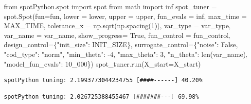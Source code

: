 \documentclass[
  letterpaper,
  DIV=11,
  numbers=noendperiod]{scrreprt}
\newenvironment{Shaded}{\begin{snugshade}}{\end{snugshade}}
\newcommand{\BuiltInTok}[1]{\textcolor[rgb]{0.00,0.23,0.31}{#1}}
\newcommand{\DecValTok}[1]{\textcolor[rgb]{0.68,0.00,0.00}{#1}}
\newcommand{\ImportTok}[1]{\textcolor[rgb]{0.00,0.46,0.62}{#1}}
\newcommand{\NormalTok}[1]{\textcolor[rgb]{0.00,0.23,0.31}{#1}}
\newcommand{\OperatorTok}[1]{\textcolor[rgb]{0.37,0.37,0.37}{#1}}
\newcommand{\StringTok}[1]{\textcolor[rgb]{0.13,0.47,0.30}{#1}}
\newcommand{\VariableTok}[1]{\textcolor[rgb]{0.07,0.07,0.07}{#1}}
\begin{document}
\begin{Shaded}
\begin{Highlighting}[]
\ImportTok{from}\NormalTok{ spotPython.spot }\ImportTok{import}\NormalTok{ spot}
\ImportTok{from}\NormalTok{ math }\ImportTok{import}\NormalTok{ inf}
\NormalTok{spot\_tuner }\OperatorTok{=}\NormalTok{ spot.Spot(fun}\OperatorTok{=}\NormalTok{fun,}
\NormalTok{                   lower }\OperatorTok{=}\NormalTok{ lower,}
\NormalTok{                   upper }\OperatorTok{=}\NormalTok{ upper,}
\NormalTok{                   fun\_evals }\OperatorTok{=}\NormalTok{ inf,}
\NormalTok{                   max\_time }\OperatorTok{=}\NormalTok{ MAX\_TIME,}
\NormalTok{                   tolerance\_x }\OperatorTok{=}\NormalTok{ np.sqrt(np.spacing(}\DecValTok{1}\NormalTok{)),}
\NormalTok{                   var\_type }\OperatorTok{=}\NormalTok{ var\_type,}
\NormalTok{                   var\_name }\OperatorTok{=}\NormalTok{ var\_name,}
\NormalTok{                   show\_progress}\OperatorTok{=} \VariableTok{True}\NormalTok{,}
\NormalTok{                   fun\_control }\OperatorTok{=}\NormalTok{ fun\_control,}
\NormalTok{                   design\_control}\OperatorTok{=}\NormalTok{\{}\StringTok{"init\_size"}\NormalTok{: INIT\_SIZE\},}
\NormalTok{                   surrogate\_control}\OperatorTok{=}\NormalTok{\{}\StringTok{"noise"}\NormalTok{: }\VariableTok{False}\NormalTok{,}
                                      \StringTok{"cod\_type"}\NormalTok{: }\StringTok{"norm"}\NormalTok{,}
                                      \StringTok{"min\_theta"}\NormalTok{: }\OperatorTok{{-}}\DecValTok{4}\NormalTok{,}
                                      \StringTok{"max\_theta"}\NormalTok{: }\DecValTok{3}\NormalTok{,}
                                      \StringTok{"n\_theta"}\NormalTok{: }\BuiltInTok{len}\NormalTok{(var\_name),}
                                      \StringTok{"model\_fun\_evals"}\NormalTok{: }\DecValTok{10\_000}\NormalTok{\})}
\NormalTok{spot\_tuner.run(X\_start}\OperatorTok{=}\NormalTok{X\_start)}
\end{Highlighting}
\end{Shaded}

\begin{verbatim}
spotPython tuning: 2.1993773044234755 [####------] 40.20% 
\end{verbatim}

\begin{verbatim}
spotPython tuning: 2.026725388455467 [#######---] 69.98% 
\end{verbatim}
\end{document}
